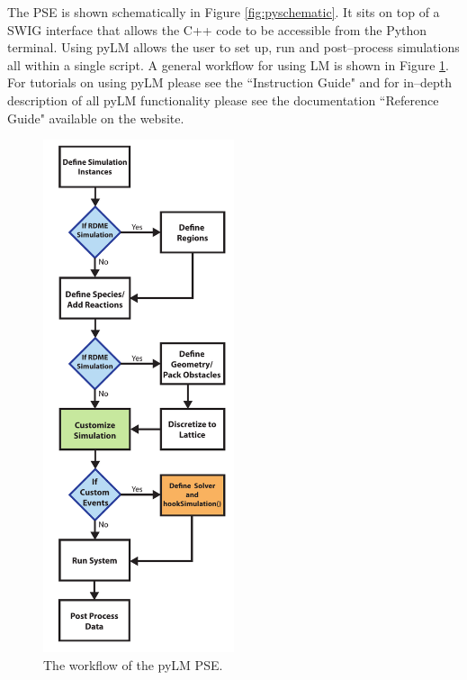 The PSE is shown schematically in Figure \ref{fig:pyschematic}.  It sits on top of a SWIG interface that allows the C++ code to be accessible from the Python terminal.  Using pyLM allows the user to set up, run and post--process simulations all within a single script.  A general workflow for using LM is shown in Figure \ref{fig:workflow}.  For tutorials on using pyLM please see the ``Instruction Guide" and for in--depth description of all pyLM functionality please see the documentation ``Reference Guide" available on the website.

\begin{figure}[h!]
  \centering
      \includegraphics[width=0.5\textwidth]{Figures/Workflow.pdf}
  \caption{The workflow of the pyLM PSE.} \label{fig:workflow}
\end{figure}
